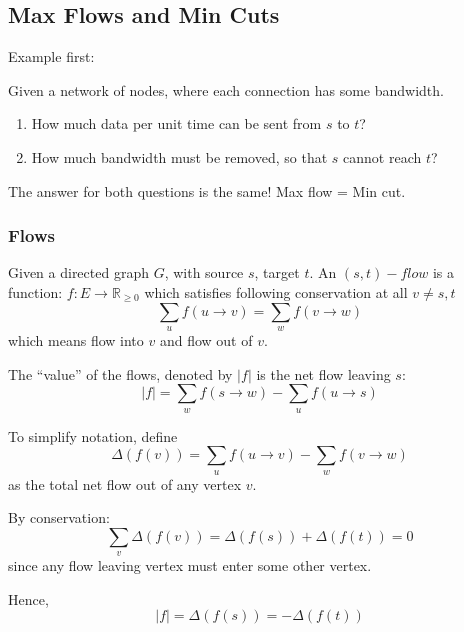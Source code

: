 \subsection{Max Flows and Min Cuts}
Example first:

Given a network of nodes, where each connection has some bandwidth.
\begin{enumerate}
    \item How much data per unit time can be sent from $s$ to $t$?
    \item How much bandwidth must be removed, so that $s$ cannot reach $t$?
\end{enumerate}
The answer for both questions is the same! Max flow = Min cut.

\subsubsection{Flows}
Given a directed graph $G$, with source $s$, target $t$. An $(s,t)-flow$ is a function:
$f:E \rightarrow \mathbb{R}_{\geq 0}$ which satisfies following conservation at all $v \neq s,t$
\[\sum_uf(u \rightarrow v) = \sum_wf(v \rightarrow w)\]
which means flow into $v$ and flow out of $v$.

The ``value'' of the flows, denoted by $|f|$ is
the net flow leaving $s$:
\[|f| = \sum_{w} f(s \rightarrow w) - \sum_{u} f(u \rightarrow s)\]

To simplify notation, define
\[\displaystyle\Delta(f(v)) = \sum_uf(u \rightarrow v) - \sum_wf(v \rightarrow w)\]
as the total net flow out of any vertex $v$.

By conservation:
\[\sum_v\Delta(f(v)) = \Delta(f(s)) + \Delta(f(t)) = 0\]
since any flow leaving vertex must enter some other vertex.

Hence,
\[|f| = \Delta(f(s)) = -\Delta(f(t))\]

